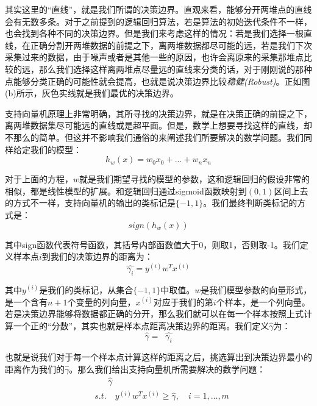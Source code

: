 \documentclass[UTF8, 12pt]{ctexart}
\begin{document}
其实这里的“直线”，就是我们所谓的决策边界。直观来看，能够分开两堆点的直线会有无数多条。对于之前提到的逻辑回归算法，若是算法的初始迭代条件不一样，也会找到各种不同的决策边界。但是我们来考虑这样的情况：若是我们选择一根直线，在正确分割开两堆数据的前提之下，离两堆数据都尽可能的远，若是我们下次采集过来的数据，由于噪声或者是其他一些的原因，也许会离原来的采集那堆点比较的远，那么我们选择这样离两堆点尽量远的直线来分类的话，对于刚刚说的那种点能够分类正确的可能性就会提高，也就是说决策边界比较\emph{稳健(Robust)}。正如图(b)所示，灰色实线就是我们最优的决策边界。

支持向量机原理上非常明确，其所寻找的决策边界，就是在决策正确的前提之下，离两堆数据集尽可能远的直线或是超平面。但是，数学上想要寻找这样的直线，却不那么的简单。但这并不影响我们通俗的来阐述我们所要解决的数学问题。我们同样给定我们的模型：
\begin{equation}
	h_{w}(x) = w_{0}x_{0} + ... + w_{n}x_{n}
\end{equation}

对于上面的方程，$w$就是我们期望寻找的模型的参数，这和逻辑回归的假设非常的相似，都是线性模型的扩展。和逻辑回归通过sigmoid函数映射到$(0,1)$区间上去的方式不一样，支持向量机的输出的类标记是$\{-1, 1\}$。我们最终判断类标记的方式是：
\begin{equation}
	 sign(h_{w}(x))
\end{equation}

其中sign函数代表符号函数，其括号内部函数值大于0，则取1，否则取-1。我们定义样本点$i$到我们的决策边界的距离为：
\begin{equation}
	\hat{\gamma_{i}}= y^{(i)}w^{T}x^{(i)}
\end{equation}

其中$y^{(i)}$是我们的类标记，从集合$\{-1, 1\}$中取值。$w$是我们模型参数的向量形式，是一个含有$n+1$个变量的列向量，$x^{(i)}$对应于我们的第$i$个样本，是一个列向量。若是决策边界能够将数据都正确的分开，那么我们就可以在每一个样本按照上式计算一个正的“分数”，其实也就是样本点距离决策边界的距离。我们定义$\hat{\gamma}$为：
\begin{equation}
	\hat{\gamma} = \mathop{\min_{i=1,...,m}} \hat{\gamma_{i}} 
\end{equation}

也就是说我们对于每一个样本点计算这样的距离之后，挑选算出到决策边界最小的距离作为我们的$\hat{\gamma}$。那么我们给出支持向量机所需要解决的数学问题：
\begin{align}
	& \mathop{\max_{w}} \quad \hat{\gamma} \\
	& s.t. \quad y^{(i)}w^{T}x^{(i)} \geq \hat{\gamma}, \quad i = 1,...,m
\end{align}
\end{document}

